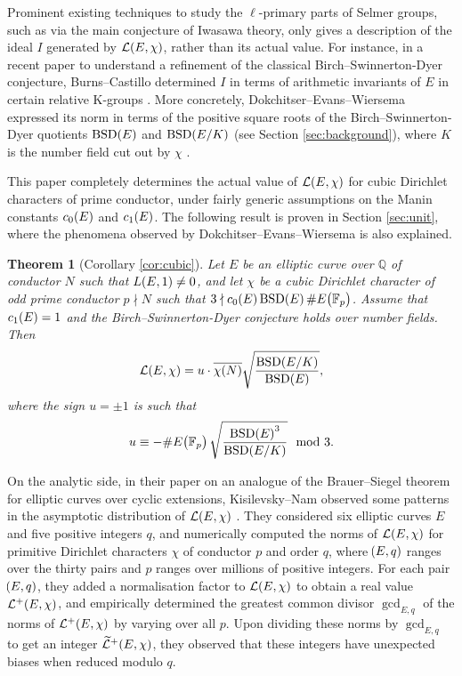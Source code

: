 \documentclass{article}
\theoremstyle{plain}
\newtheorem{theorem}[n]{Theorem}
\theoremstyle{definition}
\newcommand{\BSD}{\operatorname{BSD}}
\newcommand{\FF}{\mathbb{F}}
\newcommand{\LLL}{\mathcal{L}}
\newcommand{\QQ}{\mathbb{Q}}
\newcommand{\br}{\!\del}
\begin{document}
\pagebreak

Prominent existing techniques to study the $ \ell $-primary parts of Selmer groups, such as via the main conjecture of Iwasawa theory, only gives a description of the ideal $ I $ generated by $ \LLL\br{E, \chi} $, rather than its actual value. For instance, in a recent paper to understand a refinement of the classical Birch--Swinnerton-Dyer conjecture, Burns--Castillo determined $ I $ in terms of arithmetic invariants of $ E $ in certain relative K-groups \cite[Proposition 7.3]{BC21}. More concretely, Dokchitser--Evans--Wiersema expressed its norm in terms of the positive square roots of the Birch--Swinnerton-Dyer quotients $ \BSD\br{E} $ and $ \BSD\br[0]{E / K} $ (see Section \ref{sec:background}), where $ K $ is the number field cut out by $ \chi $ \cite[Theorem 38]{DEW21}.

This paper completely determines the actual value of $ \LLL\br{E, \chi} $ for cubic Dirichlet characters of prime conductor, under fairly generic assumptions on the Manin constants $ c_0\br{E} $ and $ c_1\br{E} $. The following result is proven in Section \ref{sec:unit}, where the phenomena observed by Dokchitser--Evans--Wiersema is also explained.

\begin{theorem}[Corollary \ref{cor:cubic}]
Let $ E $ be an elliptic curve over $ \QQ $ of conductor $ N $ such that $ L\br{E, 1} \ne 0 $, and let $ \chi $ be a cubic Dirichlet character of odd prime conductor $ p \nmid N $ such that $ 3 \nmid c_0\br{E}\BSD\br{E}\#E\br{\FF_p} $. Assume that $ c_1\br{E} = 1 $ and the Birch--Swinnerton-Dyer conjecture holds over number fields. Then
$$ \LLL\br{E, \chi} = u \cdot \overline{\chi\br{N}}\sqrt{\dfrac{\BSD\br[0]{E / K}}{\BSD\br{E}}}, $$
where the sign $ u = \pm1 $ is such that
$$ u \equiv -\#E\br{\FF_p}\sqrt{\dfrac{\BSD\br{E}^3}{\BSD\br[0]{E / K}}} \mod 3. $$
\end{theorem}

On the analytic side, in their paper on an analogue of the Brauer--Siegel theorem for elliptic curves over cyclic extensions, Kisilevsky--Nam observed some patterns in the asymptotic distribution of $ \LLL\br{E, \chi} $ \cite[Section 7]{KN22}. They considered six elliptic curves $ E $ and five positive integers $ q $, and numerically computed the norms of $ \LLL\br{E, \chi} $ for primitive Dirichlet characters $ \chi $ of conductor $ p $ and order $ q $, where $ \br{E, q} $ ranges over the thirty pairs and $ p $ ranges over millions of positive integers. For each pair $ \br{E, q} $, they added a normalisation factor to $ \LLL\br{E, \chi} $ to obtain a real value $ \LLL^+\br{E, \chi} $, and empirically determined the greatest common divisor $ \gcd_{E, q} $ of the norms of $ \LLL^+\br{E, \chi} $ by varying over all $ p $. Upon dividing these norms by $ \gcd_{E, q} $ to get an integer $ \widetilde{\LLL}^+\br{E, \chi} $, they observed that these integers have unexpected biases when reduced modulo $ q $.
\end{document}
